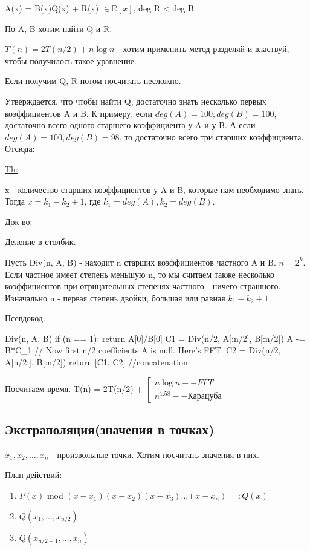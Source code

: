 A(x) = B(x)Q(x) + R(x) $\in \mathds{R}[x]$, deg R < deg B

По A, B хотим найти Q и R.

$T(n) = 2T(n/2) + n \log n$ - хотим применить метод разделяй и властвуй, чтобы получилось такое уравнение.

Если получим Q, R потом посчитать несложно.

Утверждается, что чтобы найти Q, достаточно знать несколько первых коэффициентов A и B. К примеру, если $deg(A) = 100, deg(B) = 100$, достаточно всего одного старшего коэффициента у A и у B. А если $deg(A) = 100, deg(B) = 98$, то достаточно всего три старших коэффициента. Отсюда:

\underline{Th:}

x - количество старших коэффициентов у A и B, которые нам необходимо знать. Тогда $x = k_1 - k_2 + 1$, где $k_1 = deg(A), k_2 = deg(B)$.

\underline{Док-во:}

Деление в столбик.

Пусть Div(n, A, B) - находит n старших коэффициентов частного A и B. $n = 2^k$. Если частное имеет степень меньшую n, то мы считаем также несколько коэффициентов при отрицательных степенях частного - ничего страшного. Изначально n - первая степень двойки, большая или равная $k_1 - k_2 + 1$.

Псевдокод:

\begin{cppcode}
Div(n, A, B) {
	if (n == 1): return A[0]/B[0]
	C1 = Div(n/2, A[:n/2], B[:n/2])
	A -= B*C_1 // Now first n/2 coefficients A is null. Here's FFT.
	C2 = Div(n/2, A[n/2:], B[:n/2])
	return [C1, C2] //concatenation 
}
\end{cppcode}

Посчитаем время. T(n) = 2T(n/2) + $\left[ \begin{gathered} 
										n \log n -- FFT \\
										n^{1.58} -- \text{Карацуба}
										\end{gathered}
								\right.$
								
\subsection{Экстраполяция(значения в точках)}

$x_1, x_2, \dots, x_n$ - произвольные точки. Хотим посчитать значения в них.

План действий:
\begin{enumerate}
	\item $P(x)$ mod $(x - x_1)(x - x_2)(x - x_3)\dots(x - x_n) =: Q(x)$
	\item $Q(x_1, \dots, x_{n/2})$
	\item $Q(x_{n/2 + 1}, \dots, x_n)$ 
\end{enumerate}							

